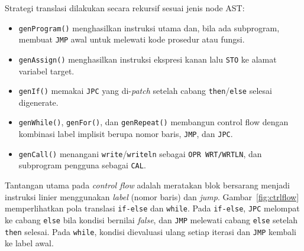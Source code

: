 \documentclass[11pt,a4paper]{article}
\begin{document}
Strategi translasi dilakukan secara rekursif sesuai jenis node AST:

\begin{itemize}
    \item \texttt{genProgram()} menghasilkan instruksi utama dan, bila ada
          subprogram, membuat \texttt{JMP} awal untuk melewati kode prosedur
          atau fungsi.
    \item \texttt{genAssign()} menghasilkan instruksi ekspresi kanan lalu
          \texttt{STO} ke alamat variabel target.
    \item \texttt{genIf()} memakai \texttt{JPC} yang di-\textit{patch} setelah
          cabang \texttt{then}/\texttt{else} selesai digenerate.
    \item \texttt{genWhile()}, \texttt{genFor()}, dan \texttt{genRepeat()}
          membangun control flow dengan kombinasi label implisit berupa nomor
          baris, \texttt{JMP}, dan \texttt{JPC}.
    \item \texttt{genCall()} menangani \texttt{write}/\texttt{writeln} sebagai
          \texttt{OPR WRT/WRTLN}, dan subprogram pengguna sebagai
          \texttt{CAL}.
\end{itemize}

Tantangan utama pada \textit{control flow} adalah meratakan blok bersarang
menjadi instruksi linier menggunakan \textit{label} (nomor baris) dan
\textit{jump}. Gambar~\ref{fig:ctrlflow} memperlihatkan pola translasi
\texttt{if-else} dan \texttt{while}. Pada \texttt{if-else}, \texttt{JPC}
melompat ke cabang \texttt{else} bila kondisi bernilai \textit{false}, dan
\texttt{JMP} melewati cabang \texttt{else} setelah \texttt{then} selesai. Pada
\texttt{while}, kondisi dievaluasi ulang setiap iterasi dan \texttt{JMP}
kembali ke label awal.
\end{document}
